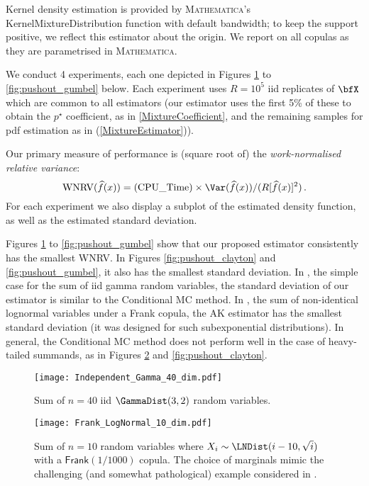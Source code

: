 Kernel density estimation is provided by \textsc{Mathematica}'s {\sf KernelMixtureDistribution} function with default bandwidth; to keep the support positive, we reflect this estimator about the origin. We report on all copulas as they are parametrised in \textsc{Mathematica}.

We conduct 4 experiments, each one depicted in Figures \ref{fig:pushout_gamma} to \ref{fig:pushout_gumbel} below.
Each experiment uses $R=10^5$ iid replicates of $\bfX$ which are common to all estimators (our estimator uses the first 5\% of these to obtain the $p^\star$ coefficient, as in \eqref{MixtureCoefficient}, and the remaining samples for pdf estimation as in (\ref{MixtureEstimator})).

Our primary measure of performance is  (square root of) the \emph{work-normalised relative variance}:
\[ \text{WNRV}(\widehat{f}(x)) = \text{(CPU\_Time)} \times \Var( \widehat{f}(x) ) / (R[\widehat{f}(x)]^2) \,. \]
 For each experiment we also display a subplot of the estimated density function, as well as the estimated standard deviation.

Figures \ref{fig:pushout_gamma} to \ref{fig:pushout_gumbel} show that our proposed estimator consistently has the smallest WNRV. In Figures \ref{fig:pushout_clayton} and \ref{fig:pushout_gumbel}, it also has the smallest standard deviation. In , the simple case for the sum of iid gamma random variables, the standard deviation of our estimator is similar to the Conditional MC method. In , the sum of non-identical lognormal variables under a Frank copula, the AK estimator has the smallest standard deviation (it was designed for such subexponential distributions). In general, the Conditional MC method does not perform well in the case of heavy-tailed summands, as in Figures \ref{fig:pushout_frank} and \ref{fig:pushout_clayton}.

\begin{figure}%
\caption{Sum of $n=40$ iid $\GammaDist(3,2)$ random variables.}
\centering
\texttt{[image: Independent\_Gamma\_40\_dim.pdf]}\vspace{3mm}
\label{fig:pushout_gamma}
\end{figure}

\begin{figure}%
\caption{    Sum of $n=10$ random variables where $X_i \sim \LNDist(i-10,\sqrt{i})$ with a $\mathsf{Frank}(1/1000)$ copula. The choice of marginals mimic the challenging (and somewhat pathological) example considered in \cite{asmussen2011efficient}.}\vspace{5mm}
\centering
\texttt{[image: Frank\_LogNormal\_10\_dim.pdf]}\vspace{3mm}
\label{fig:pushout_frank}
\end{figure}

